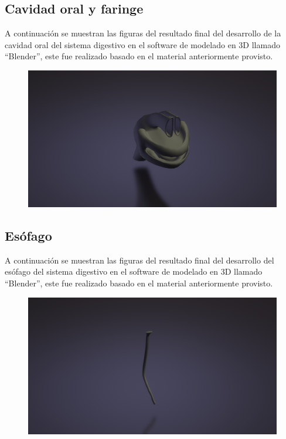 \subsection{Cavidad oral y faringe}
A continuación se muestran las figuras del resultado final del desarrollo de la cavidad oral del sistema digestivo en el software de modelado en 3D llamado “Blender”, este fue realizado basado en el material anteriormente provisto.\\
\begin{figure}[H]
	\begin{center}
 		\includegraphics[width = .5\textwidth]{source/images/image14.png}
	\end{center} 
\end{figure}

\subsection{Esófago}
A continuación se muestran las figuras del resultado final del desarrollo del esófago del sistema digestivo en el software de modelado en 3D llamado “Blender”, este fue realizado basado en el material anteriormente provisto.\\
\begin{figure}[H]
	\begin{center}
 		\includegraphics[width = .5\textwidth]{source/images/image25.png}
	\end{center} 
\end{figure}

